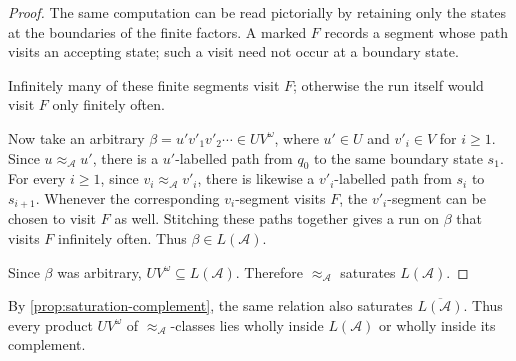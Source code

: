 \begin{proof}
The same computation can be read pictorially by retaining only the
states at the boundaries of the finite factors.  A marked $F$ records a
segment whose path visits an accepting state; such a visit need not
occur at a boundary state.

\begin{center}
\end{center}

Infinitely many of these finite segments visit $F$; otherwise the run
itself would visit $F$ only finitely often.

Now take an arbitrary
$\beta=u'v'_1v'_2\cdots\in UV^\omega$, where $u'\in U$ and
$v'_i\in V$ for $i\geq 1$.  Since
$u\approx_{\mathcal A}u'$, there is a $u'$-labelled path from $q_0$
to the same boundary state $s_1$.  For every $i\geq 1$, since
$v_i\approx_{\mathcal A}v'_i$, there is likewise a $v'_i$-labelled path
from $s_i$ to $s_{i+1}$.  Whenever the corresponding $v_i$-segment
visits $F$, the $v'_i$-segment can be chosen to visit $F$ as well.
Stitching these paths together gives a run on $\beta$ that visits $F$
infinitely often.  Thus $\beta\in L(\mathcal A)$.

Since $\beta$ was arbitrary,
$UV^\omega\subseteq L(\mathcal A)$.  Therefore
$\approx_{\mathcal A}$ saturates $L(\mathcal A)$.
\end{proof}

By \cref{prop:saturation-complement}, the same relation also saturates
$\overline{L(\mathcal A)}$.  Thus every product $UV^\omega$ of
$\approx_{\mathcal A}$-classes lies wholly inside $L(\mathcal A)$ or
wholly inside its complement.

